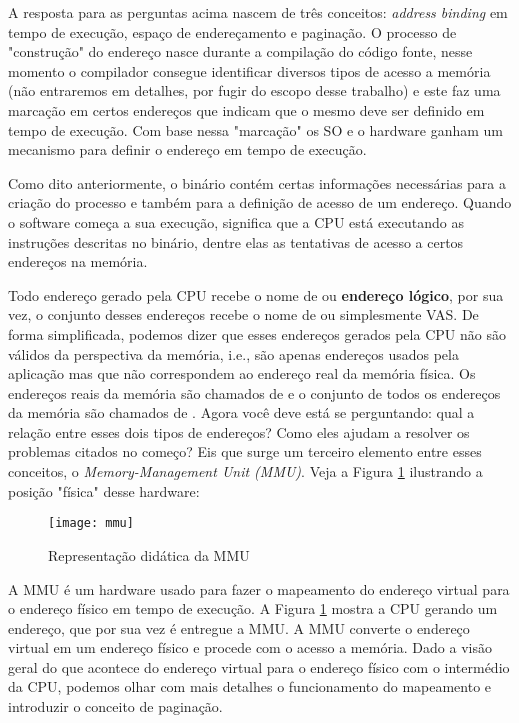A resposta para as perguntas acima nascem de três conceitos: \textit{address
binding} em tempo de execução, espaço de endereçamento e paginação. O processo
de "construção" do endereço nasce durante a compilação do código fonte, nesse
momento o compilador consegue identificar diversos tipos de acesso a memória
(não entraremos em detalhes, por fugir do escopo desse trabalho) e este faz uma
marcação em certos endereços que indicam que o mesmo deve ser definido em tempo
de execução. Com base nessa "marcação" os SO e o hardware ganham um mecanismo
para definir o endereço em tempo de execução.

Como dito anteriormente, o binário contém certas informações necessárias para a
criação do processo e também para a definição de acesso de um endereço. Quando
o software começa a sua execução, significa que a CPU está executando as
instruções descritas no binário, dentre elas as tentativas de acesso a certos
endereços na memória.

Todo endereço gerado pela CPU recebe o nome de  ou
\textbf{endereço lógico}, por sua vez, o conjunto desses
endereços recebe o nome de  ou simplesmente VAS. De forma simplificada, podemos dizer que
esses endereços gerados pela CPU não são válidos da perspectiva da memória,
i.e., são apenas endereços usados pela aplicação mas que não correspondem ao
endereço real da memória física. Os endereços reais da memória são chamados de
 e o conjunto de todos os endereços da memória são
chamados de . Agora você deve está se
perguntando: qual a relação entre esses dois tipos de endereços? Como eles
ajudam a resolver os problemas citados no começo? Eis que surge um terceiro
elemento entre esses conceitos, o \textit{Memory-Management Unit
(MMU)}. Veja a Figura \ref{fig:mmu} ilustrando a posição "física"
desse hardware:

\begin{figure}[!h]
  \centering
  \texttt{[image: mmu]} 
  \caption{Representação didática da MMU}
  \label{fig:mmu}
\end{figure}

A MMU é um hardware usado para fazer o mapeamento do endereço virtual para o
endereço físico em tempo de execução. A Figura \ref{fig:mmu} mostra a CPU
gerando um endereço, que por sua vez é entregue a MMU. A MMU converte o
endereço virtual em um endereço físico e procede com o acesso a memória. Dado a
visão geral do que acontece do endereço virtual para o endereço físico com o
intermédio da CPU, podemos olhar com mais detalhes o funcionamento do
mapeamento e introduzir o conceito de paginação.

